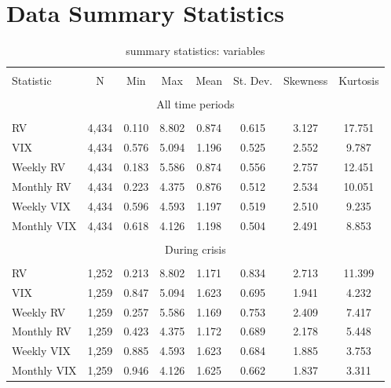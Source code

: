 \section*{Data Summary Statistics}
\begin{table}[!htbp] \centering 
  \caption{summary statistics: variables} 
  \label{tab:summary1} 
\begin{tabular}{@{\extracolsep{5pt}}lccccccc} 
\\[-1.8ex]\hline 
\hline \\[-1.8ex] 
Statistic & \multicolumn{1}{c}{N} & \multicolumn{1}{c}{Min} & \multicolumn{1}{c}{Max} & \multicolumn{1}{c}{Mean} & \multicolumn{1}{c}{St. Dev.} & \multicolumn{1}{c}{Skewness} & \multicolumn{1}{c}{Kurtosis} \\
\hline \\[-1.8ex] 
\multicolumn{8}{c}{All time periods} \\
\hline \\[-1.8ex] 
RV & 4,434 & 0.110 & 8.802 & 0.874 & 0.615 & 3.127 & 17.751 \\ 
VIX & 4,434 & 0.576 & 5.094 & 1.196 & 0.525 & 2.552 & 9.787 \\ 
Weekly RV & 4,434 & 0.183 & 5.586 & 0.874 & 0.556 & 2.757 & 12.451 \\ 
Monthly RV & 4,434 & 0.223 & 4.375 & 0.876 & 0.512 & 2.534 & 10.051\\ 
Weekly VIX & 4,434 & 0.596 & 4.593 & 1.197 & 0.519 & 2.510 & 9.235 \\ 
Monthly VIX & 4,434 & 0.618 & 4.126 & 1.198 & 0.504 & 2.491 & 8.853 \\ 
\hline \\[-1.8ex] 
\multicolumn{8}{c}{During crisis} \\
\hline \\[-1.8ex] 
RV & 1,252 & 0.213 & 8.802 & 1.171 & 0.834 & 2.713 & 11.399\\ 
VIX  & 1,259 & 0.847 & 5.094 & 1.623 & 0.695  & 1.941 &  4.232\\ 
Weekly RV & 1,259 & 0.257 & 5.586 & 1.169 & 0.753 & 2.409 & 7.417\\ 
Monthly RV & 1,259 & 0.423 & 4.375 & 1.172 & 0.689 & 2.178 & 5.448\\ 
Weekly VIX & 1,259 & 0.885 & 4.593 & 1.623 & 0.684  &  1.885 & 3.753\\ 
Monthly VIX & 1,259 & 0.946 & 4.126 & 1.625 & 0.662 & 1.837 & 3.311\\ 

\end{tabular}
\end{table}
